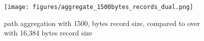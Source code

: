 \begin{figure}[b]
  \texttt{[image: figures/aggregate\_1500bytes\_records\_dual.png]}
  \caption{\tcpls path aggregation with 1500, bytes record size, compared to
    \tls over \mptcp with 16,384 bytes record size}
  \label{fig:aggregation_1500bytes_records}
\end{figure}

%
%
%

